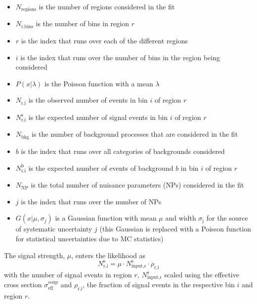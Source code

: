 \begin{itemize}
\item $N_{\text{regions}}$ is the number of regions considered in the fit
\item $N_\text{r,bins}$ is the number of bins in region $r$
\item $r$ is the index that runs over each of the different regions
\item $i$ is the index that runs over the number of bins in the region being considered
\item $P(x|\lambda)$ is the Poisson function with a mean $\lambda$
\item $N_\text{r,i}$ is the observed number of events in bin $i$ of region $r$
\item $N_\text{r,i}^\text{s}$ is the expected number of signal events in bin $i$ of region $r$
\item $N_\text{bkg}$ is the number of background processes that are considered in the fit
\item $b$ is the index that runs over all categories of backgrounds considered
\item $N_\text{r,i}^\text{b}$ is the expected number of events of background $b$ in bin $i$ of region $r$
\item $N_\text{NP}$ is the total number of nuisance parameters (NPs) considered in the fit
\item $j$ is the index that runs over the number of NPs
\item $G(x|\mu,\sigma_{j})$ is a Gaussian function with mean $\mu$ and width $\sigma_\text{j}$ for the source of systematic uncertainty $j$ (this Gaussian is replaced with a Poisson function for statistical uncertainties due to MC statistics)
\end{itemize}

The signal strength, $\mu$, enters the likelihood as
\[ N_\text{r,i}^\text{s} = \mu \cdot N_\text{input,r}^\text{s} \cdot \rho_\text{r,i}
\]
with the number of signal events in region $r$, $N_\text{input,r}^\text{s}$ scaled using the effective cross section $\sigma_\text{eff}^\text{coup}$ and $\rho_\text{r,i}$, the fraction of signal events in the respective bin $i$ and region $r$. 

